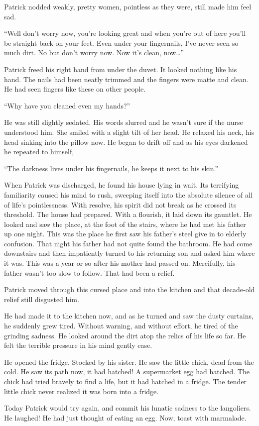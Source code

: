 \documentclass[11pt]{article}
\begin{document}
Patrick nodded weakly, pretty women, pointless as they were, still made him feel sad.

``Well don't worry now, you're looking great and when you're out of here you'll be straight back on your feet. Even under your fingernails, I've never seen so much dirt. No but don't worry now. Now it's clean, now…''

Patrick freed his right hand from under the duvet. It looked nothing like his hand. The nails had been neatly trimmed and the fingers were matte and clean. He had seen fingers like these on other people.

``Why have you cleaned even my hands?''

He was still slightly sedated. His words slurred and he wasn't sure if the nurse understood him. She smiled with a slight tilt of her head. He relaxed his neck, his head sinking into the pillow now. He began to drift off and as his eyes darkened he repeated to himself,

``The darkness lives under his fingernails, he keeps it next to his skin.''

When Patrick was discharged, he found his house lying in wait. Its terrifying familiarity caused his mind to rush, sweeping itself into the absolute silence of all of life’s pointlessness. With resolve, his spirit did not break as he crossed its threshold. The house had prepared. With a flourish, it laid down its gauntlet. He looked and saw the place, at the foot of the stairs, where he had met his father up one night. This was the place he first saw his father’s steel give in to elderly confusion. That night his father had not quite found the bathroom. He had come downstairs and then impatiently turned to his returning son and asked him where it was. This was a year or so after his mother had passed on. Mercifully, his father wasn’t too slow to follow. That had been a relief.

Patrick moved through this cursed place and into the kitchen and that decade-old relief still disgusted him.

He had made it to the kitchen now, and as he turned and saw the dusty curtains, he suddenly grew tired. Without warning, and without effort, he tired of the grinding sadness. He looked around the dirt atop the relics of his life so far. He felt the terrible pressure in his mind gently ease.

He opened the fridge. Stocked by his sister. He saw the little chick, dead from the cold. He saw its path now, it had hatched! A supermarket egg had hatched. The chick had tried bravely to find a life, but it had hatched in a fridge. The tender little chick never realized it was born into a fridge.

Today Patrick would try again, and commit his lunatic sadness to the langoliers. He laughed! He had just thought of eating an egg. Now, toast with marmalade.
\end{document}
